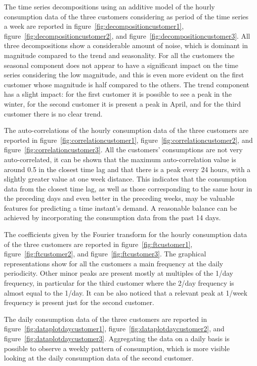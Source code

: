 The time series decompositions using an additive model of the hourly consumption data of the three customers considering as period of the time series a week are reported in figure~\ref{fig:decompositioncustomer1}, figure~\ref{fig:decompositioncustomer2}, and figure~\ref{fig:decompositioncustomer3}.
All three decompositions show a considerable amount of noise, which is dominant in magnitude compared to the trend and seasonality.
For all the customers the seasonal component does not appear to have a significant impact on the time series considering the low magnitude, and this is even more evident on the first customer whose magnitude is half compared to the others.
The trend component has a slight impact: for the first customer it is possible to see a peak in the winter, for the second customer it is present a peak in April, and for the third customer there is no clear trend.

The auto-correlations of the hourly consumption data of the three customers are reported in figure~\ref{fig:correlationcustomer1}, figure~\ref{fig:correlationcustomer2}, and figure~\ref{fig:correlationcustomer3}.
All the customers' consumptions are not very auto-correlated, it can be shown that the maximum auto-correlation value is around 0.5 in the closest time lag and that there is a peak every 24 hours, with a slightly greater value at one week distance.
This indicates that the consumption data from the closest time lag, as well as those corresponding to the same hour in the preceding days and even better in the preceding weeks, may be valuable features for predicting a time instant's demand.
A reasonable balance can be achieved by incorporating the consumption data from the past 14 days.

The coefficients given by the Fourier transform for the hourly consumption data of the three customers are reported in figure~\ref{fig:ftcustomer1}, figure~\ref{fig:ftcustomer2}, and figure~\ref{fig:ftcustomer3}.
The graphical representations show for all the customers a main frequency at the daily periodicity.
Other minor peaks are present mostly at multiples of the 1/day frequency, in particular for the third customer where the 2/day frequency is almost equal to the 1/day.
It can be also noticed that a relevant peak at 1/week frequency is present just for the second customer.

The daily consumption data of the three customers are reported in figure~\ref{fig:dataplotdaycustomer1}, figure~\ref{fig:dataplotdaycustomer2}, and figure~\ref{fig:dataplotdaycustomer3}.
Aggregating the data on a daily basis is possible to observe a weekly pattern of consumption, which is more visible looking at the daily consumption data of the second customer.

